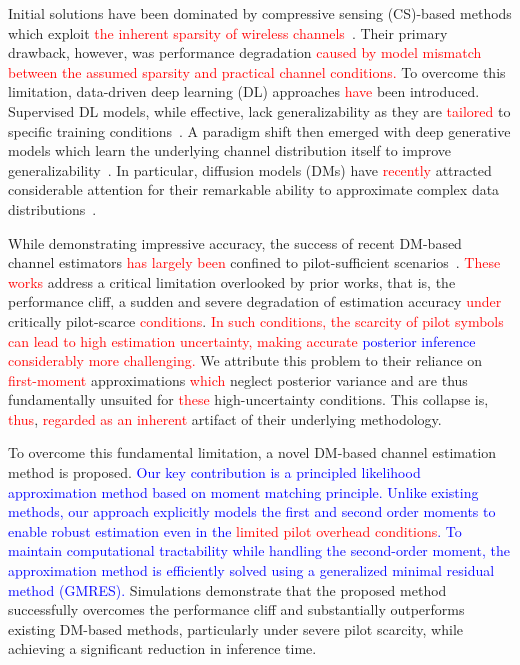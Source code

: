 \documentclass[lettersize,journal]{IEEEtran}
\newcommand{\tred}{\textcolor{red}}
\newcommand{\tblue}{\textcolor{blue}}
\begin{document}
Initial solutions have been dominated by compressive sensing (CS)-based methods which exploit \tred{the inherent sparsity of wireless channels}~\cite{zhangAtomicNormDenoisingBased2018,choiCompressedSensingWireless2017}. Their primary drawback, however, was performance degradation \tred{caused by model mismatch between the assumed sparsity and practical channel conditions.} To overcome this limitation, data-driven deep learning (DL) approaches \tred{have} been introduced. Supervised DL models, while effective, lack generalizability as they are \tred{tailored} to specific training conditions~\cite{heDeepLearningBasedChannel2018}. A paradigm shift then emerged with deep generative models which learn the underlying channel distribution itself to improve generalizability~\cite{vanhuynhGenerativeAIPhysical2024}. In particular, diffusion models (DMs) have \tred{recently} attracted considerable attention for their remarkable ability to approximate complex data distributions~\cite{hoDenoisingDiffusionProbabilistic2020}.

While demonstrating impressive accuracy, the success of recent DM-based channel estimators \tred{has largely been} confined to pilot-sufficient scenarios~\cite{arvinteMIMOChannelEstimation2023,zhouGenerativeDiffusionModels2025}. \tred{These works} address a critical limitation overlooked by prior works, that is, the performance cliff, a sudden and severe degradation of estimation accuracy \tred{under} critically pilot-scarce \tred{conditions}. \tred{In such conditions, the scarcity of pilot symbols can lead to high estimation uncertainty, making accurate \tblue{posterior inference} considerably more challenging.} We attribute this problem to their reliance on \tred{first-moment} approximations \tred{which} neglect posterior variance and are thus fundamentally unsuited for \tred{these} high-uncertainty conditions. This collapse is, \tred{thus}, \tred{regarded as an inherent} artifact of their underlying methodology.

To overcome this fundamental limitation, a novel DM-based channel estimation method is proposed. \tblue{Our key contribution is a principled likelihood approximation method based on moment matching principle.} \tblue{Unlike existing methods, our approach explicitly models the first and second order moments to enable robust estimation even in the \tred{limited pilot overhead conditions}.} \tblue{To maintain computational tractability while handling the second-order moment, the approximation method is efficiently solved using a generalized minimal residual method (GMRES).} Simulations demonstrate that the proposed method successfully overcomes the performance cliff and substantially outperforms existing DM-based methods, particularly under severe pilot scarcity, while achieving a significant reduction in inference time.
\end{document}
